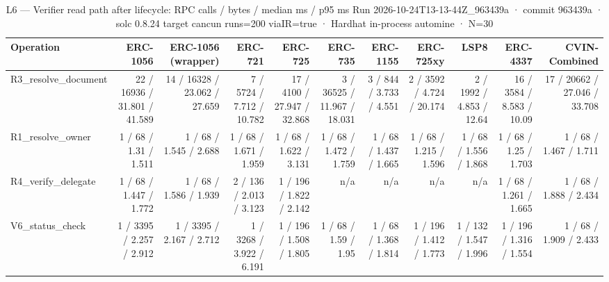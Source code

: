 \begin{table}[ht]
\centering
\small
\begin{tabular}{lrrrrrrrrrr}
\toprule
Operation & ERC-1056 & ERC-1056 (wrapper) & ERC-721 & ERC-725 & ERC-735 & ERC-1155 & ERC-725xy & LSP8 & ERC-4337 & CVIN-Combined \\
\midrule
R3\_resolve\_document & 22 / 16936 / 31.801 / 41.589 & 14 / 16328 / 23.062 / 27.659 & 7 / 5724 / 7.712 / 10.782 & 17 / 4100 / 27.947 / 32.868 & 3 / 36525 / 11.967 / 18.031 & 3 / 844 / 3.733 / 4.551 & 2 / 3592 / 4.724 / 20.174 & 2 / 1992 / 4.853 / 12.64 & 16 / 3584 / 8.583 / 10.09 & 17 / 20662 / 27.046 / 33.708 \\
R1\_resolve\_owner & 1 / 68 / 1.31 / 1.511 & 1 / 68 / 1.545 / 2.688 & 1 / 68 / 1.671 / 1.959 & 1 / 68 / 1.622 / 3.131 & 1 / 68 / 1.472 / 1.759 & 1 / 68 / 1.437 / 1.665 & 1 / 68 / 1.215 / 1.596 & 1 / 68 / 1.556 / 1.868 & 1 / 68 / 1.25 / 1.703 & 1 / 68 / 1.467 / 1.711 \\
R4\_verify\_delegate & 1 / 68 / 1.447 / 1.772 & 1 / 68 / 1.586 / 1.939 & 2 / 136 / 2.013 / 3.123 & 1 / 196 / 1.822 / 2.142 & n/a & n/a & n/a & n/a & 1 / 68 / 1.261 / 1.665 & 1 / 68 / 1.888 / 2.434 \\
V6\_status\_check & 1 / 3395 / 2.257 / 2.912 & 1 / 3395 / 2.167 / 2.712 & 1 / 3268 / 3.922 / 6.191 & 1 / 196 / 1.508 / 1.805 & 1 / 68 / 1.59 / 1.95 & 1 / 68 / 1.368 / 1.814 & 1 / 196 / 1.412 / 1.773 & 1 / 132 / 1.547 / 1.996 & 1 / 196 / 1.316 / 1.554 & 1 / 68 / 1.909 / 2.433 \\
\bottomrule
\end{tabular}
\caption{L6 — Verifier read path after lifecycle: RPC calls / bytes / median ms / p95 ms Run 2026-10-24T13-13-44Z\_963439a · commit 963439a · solc 0.8.24 target cancun runs=200 viaIR=true · Hardhat in-process automine · N=30}
\label{tab:resolve}
\end{table}
